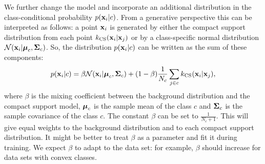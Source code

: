 	We further change the model and incorporate an additional distribution in the class-conditional probability $p(\mathbf{x}_i|c)$. From a generative perspective this can be interpreted as follows: a point $\mathbf{x}_i$ is generated by either the compact support distribution from each point $k_\text{CS}(\mathbf{x}_i|\mathbf{x}_j)$ or by a class-specific normal distribution $\mathcal{N}(\mathbf{x}_i|\mbox{\boldmath $\mu$}_c,\mbox{\boldmath $\Sigma$}_c)$. So, the distribution $p(\mathbf{x}_i|c)$ can be written as the sum of these components:
		\begin{align}
			p(\mathbf{x}_i|c) = \beta \mathcal{N}(\mathbf{x}_i|\mbox{\boldmath $\mu$}_c,\mbox{\boldmath $\Sigma$}_c) + (1-\beta)
	\frac{1}{N_c}\sum_{j\in c} k_\text{CS}(\mathbf{x}_i|\mathbf{x}_j),
			\label{eq:nca-cs-back-1}
		\end{align}
	where $\beta$ is the mixing coefficient between the background distribution and
	the compact support model, $\mbox{\boldmath $\mu$}_c$ is the sample mean of the class $c$ and $\mbox{\boldmath $\Sigma$}_c$ is the sample
	covariance of the class $c$. The constant $\beta$ can be set to $\frac{1}{N_c+1}$. This will give equal weights to the background distribution and to each compact support distribution. It might be better to treat $\beta$ as a parameter and fit it during training. We expect $\beta$ to adapt to the data set: for example, $\beta$ should increase for data sets with convex classes. 
	
